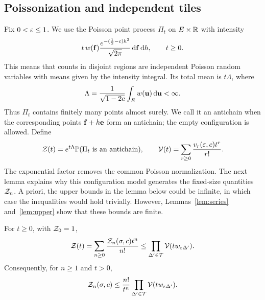 \documentclass[11pt,letterpaper]{article}
\begin{document}
\subsection{Poissonization and independent tiles}

Fix $0<\varepsilon\le1$. We use the Poisson point process $\Pi_t$ on $E\times\mathbb R$ with intensity
\[
      t\,w(\mathbf f)\frac{e^{-(\frac12-c)h^2}}{\sqrt{2\pi}}\,\mathrm d\mathbf f\,\mathrm d h,
      \qquad t\ge0.
\]
This means that counts in disjoint regions are independent Poisson random variables with means given by the intensity integral. Its total mean is $t\Lambda$, where
\begin{equation}\label{eq:poisson-mass}
      \Lambda=\frac1{\sqrt{1-2c}}\int_Ew(\mathbf u)\,\mathrm d\mathbf u<\infty.
\end{equation}
Thus $\Pi_t$ contains finitely many points almost surely. We call it an antichain when the corresponding points $\mathbf f+h\mathbf e$ form an antichain; the empty configuration is allowed. Define
\[
      \mathcal Z(t)=e^{t\Lambda}\mathbb P(\Pi_t\text{ is an antichain}),
      \qquad \mathcal V(t)=\sum_{r\ge0}\frac{v_r(\varepsilon,c)t^r}{r!}.
\]
The exponential factor removes the common Poisson normalization.
The next lemma explains why this configuration model generates the fixed-size quantities $\mathcal Z_n$. A priori, the upper bounds in the lemma below could be infinite, in which case the inequalities would hold trivially. However, Lemmas~\ref{lem:series} and~\ref{lem:upper} show that these bounds are finite.
\begin{lemma}\label{lem:tile-product}
      For $t\ge0$, with $\mathcal Z_0=1$,
      \begin{equation}\label{eq:poissonization}
            \mathcal Z(t)=\sum_{n\ge0}\frac{\mathcal Z_n(\sigma,c)t^n}{n!}
            \le\prod_{\Delta'\in\mathcal T}\mathcal V(tw_{\varepsilon\Delta'}).
      \end{equation}
      Consequently, for $n\ge1$ and $t>0$,
      \begin{equation}\label{eq:occupancy}
            \mathcal Z_n(\sigma,c)\le \frac{n!}{t^{n}}\prod_{\Delta'\in\mathcal T}\mathcal V(tw_{\varepsilon\Delta'}).
      \end{equation}
\end{lemma}
\end{document}
